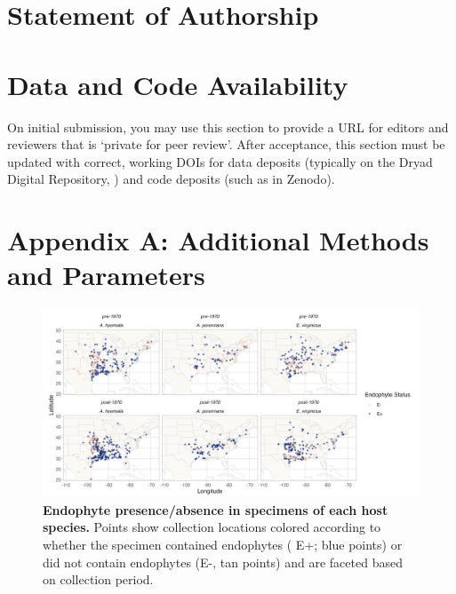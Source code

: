 \documentclass[11pt]{article}
\begin{document}
	
	\section*{Statement of Authorship}
	

	
	\section*{Data and Code Availability}
	
	On initial submission, you may use this section to provide a URL for editors and reviewers that is `private for peer review'. After acceptance, this section must be updated with correct, working DOIs for data deposits (typically on the Dryad Digital Repository, \citealt{CookEtAl2015}) and code deposits (such as in Zenodo). 
	
	\section*{Appendix A: Additional Methods and Parameters}
	\renewcommand{\thefigure}{A\arabic{figure}}
	\setcounter{figure}{0}
	
		\renewcommand{\thetable}{A\arabic{table}}
	\setcounter{equation}{0}  %
	\setcounter{figure}{0}
	\setcounter{table}{0}
	
	\begin{figure}[H]
		\centering
		\includegraphics[width = \linewidth]{endo_status_map.png}
		\caption{\textbf{Endophyte presence/absence in specimens of each host species.} Points show collection locations colored according to whether the specimen contained endophytes ( E+; blue points) or did not contain endophytes (E-, tan points) and are faceted based on collection period.}
	\end{figure}
	
\end{document}
